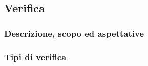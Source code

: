 \subsection{Verifica}

\subsubsection{Descrizione, scopo ed aspettative}

\subsubsection{Tipi di verifica}



